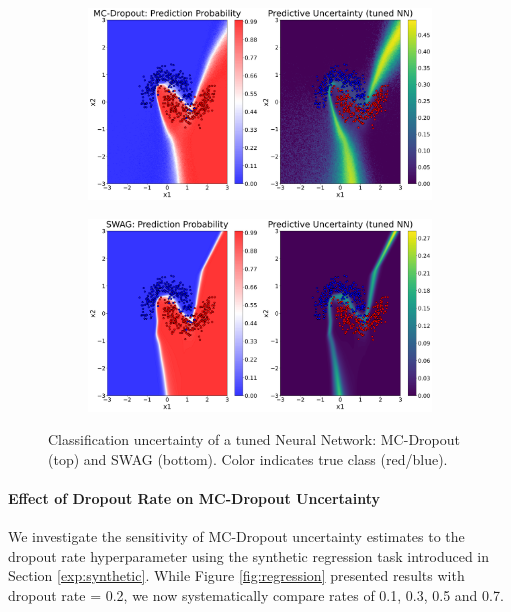 \begin{figure}[ht]
  \centering
  \begin{subfigure}{0.8\textwidth}
    \centering
    \includegraphics[width=\textwidth]{plots/mcd_cla_tuned.png}
  \end{subfigure}
  
  \vspace{0.3cm}
  \begin{subfigure}{0.8\textwidth}
    \centering
    \includegraphics[width=\textwidth]{plots/swag_cla_tuned.png}
  \end{subfigure}
  \caption{Classification uncertainty of a tuned Neural Network: MC-Dropout (top) and SWAG (bottom). Color indicates true class (red/blue).}
  \label{fig:classification_tuned}
\end{figure}

\FloatBarrier

\paragraph{Effect of Dropout Rate on MC-Dropout Uncertainty}
We investigate the sensitivity of MC-Dropout uncertainty estimates to the dropout rate hyperparameter
using the synthetic regression task introduced in Section \ref{exp:synthetic}. While Figure
\ref{fig:regression} presented results with dropout rate = 0.2, we now systematically compare rates of
0.1, 0.3, 0.5 and 0.7. 

